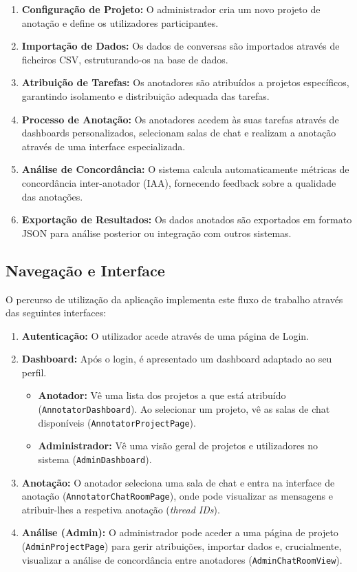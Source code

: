 \begin{enumerate}
    \item \textbf{Configuração de Projeto:} O administrador cria um novo projeto de anotação e define os utilizadores participantes.
    \item \textbf{Importação de Dados:} Os dados de conversas são importados através de ficheiros CSV, estruturando-os na base de dados.
    \item \textbf{Atribuição de Tarefas:} Os anotadores são atribuídos a projetos específicos, garantindo isolamento e distribuição adequada das tarefas.
    \item \textbf{Processo de Anotação:} Os anotadores acedem às suas tarefas através de dashboards personalizados, selecionam salas de chat e realizam a anotação através de uma interface especializada.
    \item \textbf{Análise de Concordância:} O sistema calcula automaticamente métricas de concordância inter-anotador (IAA), fornecendo feedback sobre a qualidade das anotações.
    \item \textbf{Exportação de Resultados:} Os dados anotados são exportados em formato JSON para análise posterior ou integração com outros sistemas.
\end{enumerate}

\subsection{Navegação e Interface}

O percurso de utilização da aplicação implementa este fluxo de trabalho através das seguintes interfaces:

\begin{enumerate}
    \item \textbf{Autenticação:} O utilizador acede através de uma página de Login.
    \item \textbf{Dashboard:} Após o login, é apresentado um dashboard adaptado ao seu perfil.
    \begin{itemize}
        \item \textbf{Anotador:} Vê uma lista dos projetos a que está atribuído (\texttt{AnnotatorDashboard}). Ao selecionar um projeto, vê as salas de chat disponíveis (\texttt{AnnotatorProjectPage}).
        \item \textbf{Administrador:} Vê uma visão geral de projetos e utilizadores no sistema (\texttt{AdminDashboard}).
    \end{itemize}
    \item \textbf{Anotação:} O anotador seleciona uma sala de chat e entra na interface de anotação (\texttt{AnnotatorChatRoomPage}), onde pode visualizar as mensagens e atribuir-lhes a respetiva anotação (\textit{thread IDs}).
    \item \textbf{Análise (Admin):} O administrador pode aceder a uma página de projeto (\texttt{AdminProjectPage}) para gerir atribuições, importar dados e, crucialmente, visualizar a análise de concordância entre anotadores (\texttt{AdminChatRoomView}).
\end{enumerate}

